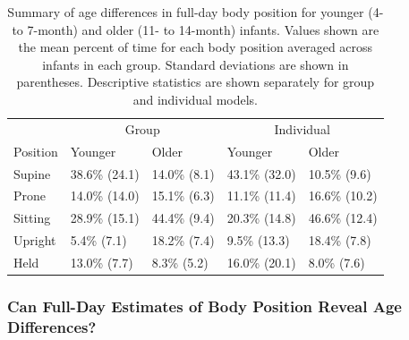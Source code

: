 \documentclass[
  man]{apa6}
\begin{document}
\begin{table}[tbp]

\begin{center}
\begin{threeparttable}

\caption{\label{tab:agetable}Summary of age differences in full-day body position for younger (4- to 7-month) and older (11- to 14-month) infants. Values shown are the mean percent of time for each body position averaged across infants in each group. Standard deviations are shown in parentheses. Descriptive statistics are shown separately for group and individual models.}

\begin{tabular}{lllll}
\toprule
 & \multicolumn{2}{c}{Group} & \multicolumn{2}{c}{Individual} \\
\cmidrule(r){2-3} \cmidrule(r){4-5}
Position & Younger & Older & Younger & Older\\
\midrule
Supine & 38.6\% (24.1) & 14.0\% (8.1) & 43.1\% (32.0) & 10.5\% (9.6)\\
Prone & 14.0\% (14.0) & 15.1\% (6.3) & 11.1\% (11.4) & 16.6\% (10.2)\\
Sitting & 28.9\% (15.1) & 44.4\% (9.4) & 20.3\% (14.8) & 46.6\% (12.4)\\
Upright & 5.4\% (7.1) & 18.2\% (7.4) & 9.5\% (13.3) & 18.4\% (7.8)\\
Held & 13.0\% (7.7) & 8.3\% (5.2) & 16.0\% (20.1) & 8.0\% (7.6)\\
\bottomrule
\end{tabular}

\end{threeparttable}
\end{center}

\end{table}

\hypertarget{can-full-day-estimates-of-body-position-reveal-age-differences}{%
\subsubsection{Can Full-Day Estimates of Body Position Reveal Age Differences?}\label{can-full-day-estimates-of-body-position-reveal-age-differences}}
\end{document}
